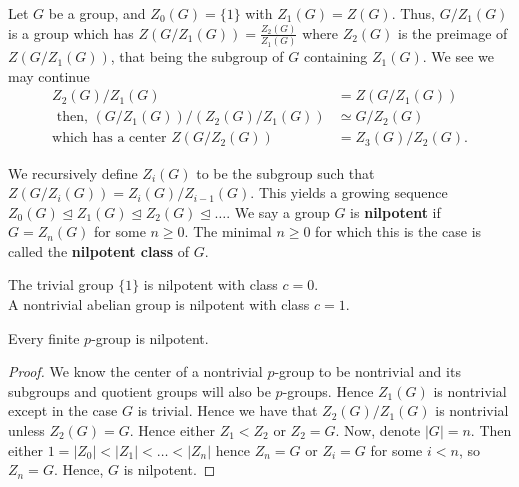 Let \(G\) be a group, and \(Z_0 \left( G \right)  = \{1\} \) with \(Z_1 \left( G \right)  = Z\left( G \right) \). Thus, \( G / Z_1\left( G \right) \) is a group which has \(Z\left( G / Z_1\left( G \right)  \right)  = \frac{Z_2 \left( G \right) }{Z_1 \left( G \right) }\) where \(Z_2\left( G \right) \) is the preimage of \( Z(G  / Z_1\left( G \right)) \), that being the subgroup of \(G\) containing \(Z_1 \left( G \right) \). We see we may continue
\begin{align*}
	Z_2 \left( G \right) / Z_1\left( G \right)  &=  Z\left( G / Z_1 \left( G \right)  \right)  \\
	\text{ then, } \left( G / Z_1\left( G \right)  \right)  / \left( Z_2 \left( G \right)  / Z_1 \left( G \right) \right) &\simeq G / Z_2\left( G \right)\\
	\text{which has a center } Z\left( G / Z_2\left( G \right)  \right) &=  Z_3 \left( G \right) / Z_2\left( G \right)
.\end{align*}
\begin{definition}[Nilpotence]
	We recursively define \(Z_{i} \left( G \right) \) to be the subgroup such that \(Z\left( G / Z_i \left( G \right)  \right) = Z_{i}\left( G \right)  / Z_{i-1} \left( G \right)  \). This yields a growing sequence \(Z_0 \left( G \right)  \trianglelefteq Z_1 \left( G \right)  \trianglelefteq Z_2\left( G \right)  \trianglelefteq \ldots\). We say a group \(G\) is \textbf{nilpotent} if \(G = Z_{n} \left( G \right) \) for some \(n\ge 0\). The minimal \(n\ge 0\) for which this is the case is called the \textbf{nilpotent class} of \(G\).
\end{definition}
\begin{example}
	The trivial group \(\{1\} \) is nilpotent with class \(c = 0\).\\
	A nontrivial abelian group is nilpotent with class \(c=1\).\\
\end{example}
\begin{theorem}
	Every finite \(p\)-group is nilpotent.
\end{theorem}
\begin{proof}
	We know the center of a nontrivial \(p\)-group to be nontrivial and its subgroups and quotient groups will also be \(p\)-groups. Hence \(Z_1\left( G \right) \) is nontrivial except in the case \(G\) is trivial. Hence we have that \(Z_2\left( G \right)  / Z_1\left( G \right) \) is nontrivial unless \(Z_2 \left( G \right)  = G\). Hence either \(Z_1 < Z_2\) or \(Z_2 = G\). Now, denote \(\left| G \right|  = n\). Then either \(1 = \left| Z_0 \right|  < \left| Z_1 \right|  < \ldots < \left| Z_{n} \right| \) hence \(Z_{n} = G\) or \(Z_{i} = G\) for some \(i < n\), so \(Z_{n} = G\). Hence, \(G\) is nilpotent.
\end{proof}

